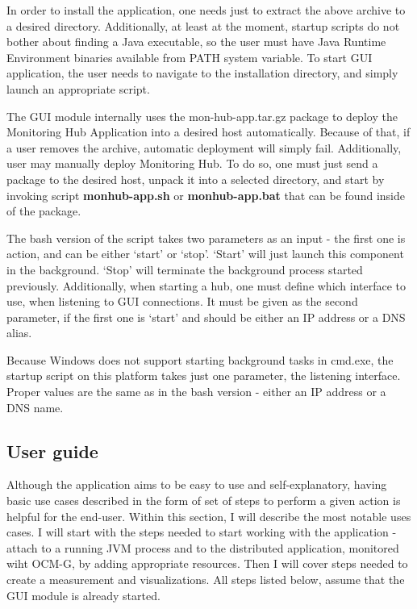 In order to install the application, one needs just to extract the above archive to a desired directory. Additionally, at least at the moment, startup scripts do not bother about finding a Java executable, so the user must have Java Runtime Environment binaries available from PATH system variable. To start GUI application, the user needs to navigate to the installation directory, and simply launch an appropriate script.

The GUI module internally uses the mon-hub-app.tar.gz package to deploy the Monitoring Hub Application into a desired host automatically. Because of that, if a user removes the archive, automatic deployment will simply fail. Additionally, user may manually deploy Monitoring Hub. To do so, one must just send a package to the desired host, unpack it into a selected directory, and start by invoking script {\bf monhub-app.sh} or {\bf monhub-app.bat} that can be found inside of the package.

The bash version of the script takes two parameters as an input - the first one is action, and can be either \lq{}start\rq{} or \lq{}stop\rq{}. \lq{}Start\rq{} will just launch this component in the background. \lq{}Stop\rq{} will terminate the background process started previously. Additionally, when starting a hub, one must define which interface to use, when listening to GUI connections. It must be given as the second parameter, if the first one is \lq{}start\rq{} and should be either an IP address or a DNS alias.

Because Windows does not support starting background tasks in cmd.exe, the startup script on this platform takes just one parameter, the listening interface. Proper values are the same as in the bash version - either an IP address or a DNS name.

\subsection{User guide}

Although the application aims to be easy to use and self-explanatory, having basic use cases described in the form of set of steps to perform a given action is helpful for the end-user. Within this section, I will describe the most notable uses cases. I will start with the steps needed to start working with the application - attach to a running JVM process and to the distributed application, monitored wiht OCM-G, by adding appropriate resources. Then I will cover steps needed to create a measurement and visualizations. All steps listed below, assume that the GUI module is already started.

